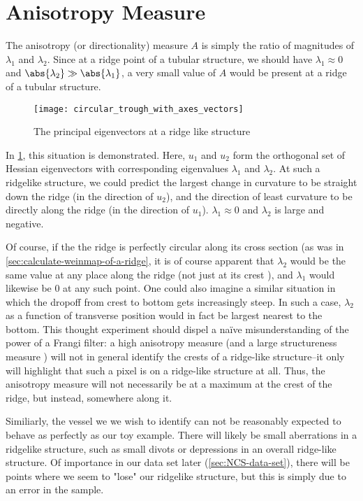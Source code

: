 \section{Anisotropy Measure} \label{sec:frangi.anisotropy}
The anisotropy (or directionality) measure $A$ is simply the ratio of magnitudes of $\lambda_1$ and $\lambda_2$. Since at a ridge point of a tubular structure, we should have $\lambda_1 \approx 0$ and $\abs{\lambda_2} \gg \abs{\lambda_1}$,
a very small value of $A$ would be present at a ridge of a tubular structure.

\begin{figure} \centering
  \texttt{[image: circular\_trough\_with\_axes\_vectors]}
  \caption{The principal eigenvectors at a ridge like structure} 
  \label{fig:circular_trough_with_axes_vectors}
\end{figure}

In \cref{fig:circular_trough_with_axes_vectors}, this situation is demonstrated. Here, $u_1$ and $u_2$ form the orthogonal set of Hessian eigenvectors with corresponding eigenvalues $\lambda_1$ and $\lambda_2$. At such a ridgelike structure, we could predict the largest change in curvature to be straight down the ridge (in the direction of $u_2$), and the direction of least curvature to be directly along the ridge (in the direction  of $u_1$). $\lambda_1 \approx 0$ and $\lambda_2$ is large and negative.

Of course, if the the ridge is perfectly circular along its cross section (as was in \cref{sec:calculate-weinmap-of-a-ridge}, it is of course apparent that $\lambda_2$ would be the same value at any place along the ridge (not just at its crest ), and $\lambda_1$ would likewise be 0 at any such point.  One could also imagine a similar situation in which the dropoff from crest to bottom gets increasingly steep. In such a case, $\lambda_2$ as a function of transverse position would in fact be largest nearest to the bottom. This thought experiment should dispel a na\"{i}ve misunderstanding of the power of a Frangi filter: a high anisotropy measure (and a large structureness measure ) will not in general identify the crests of a ridge-like structure--it only will highlight that such a pixel is on a ridge-like structure at all. Thus, the anisotropy measure will not necessarily be at a maximum at the crest of the ridge, but instead, somewhere along it.

Similiarly, the vessel we we wish to identify can not be reasonably expected to behave as perfectly as our toy example. There will likely be small aberrations in a ridgelike structure, such as small divots or depressions in an overall ridge-like structure. Of importance in our data set later (\cref{sec:NCS-data-set}), there will be points where we seem to "lose" our ridgelike structure,
but this is simply due to an error in the sample.

